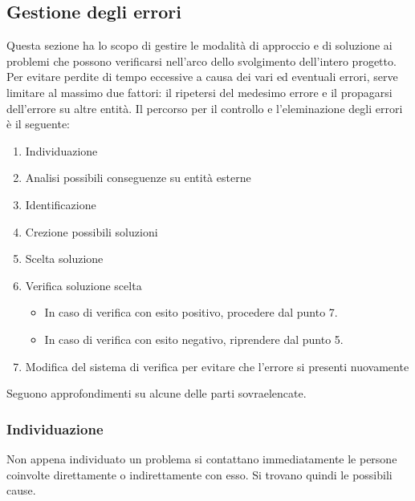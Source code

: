 \subsection{Gestione degli errori}
Questa sezione ha lo scopo di gestire le modalità di approccio e di soluzione ai problemi 
che possono verificarsi nell'arco dello svolgimento dell'intero progetto.
Per evitare perdite di tempo eccessive a causa dei vari ed eventuali errori, serve limitare 
al massimo due fattori: il ripetersi del medesimo errore e il propagarsi dell'errore su altre 
entità. \newline
Il percorso per il controllo e l'eleminazione degli errori è il seguente:
\begin{enumerate}
    \item Individuazione
    \item Analisi possibili conseguenze su entità esterne
    \item Identificazione
    \item Crezione possibili soluzioni
    \item Scelta soluzione
    \item Verifica soluzione scelta
    \begin{itemize}
        \item In caso di verifica con esito positivo, procedere dal punto 7.
        \item In caso di verifica con esito negativo, riprendere dal punto 5.
    \end{itemize}
    \item Modifica del sistema di verifica per evitare che l'errore si presenti nuovamente
\end{enumerate}
Seguono approfondimenti su alcune delle parti sovraelencate.
\subsubsection{Individuazione}
Non appena individuato un problema si contattano immediatamente le persone coinvolte direttamente o 
indirettamente con esso. Si trovano quindi le possibili cause.

